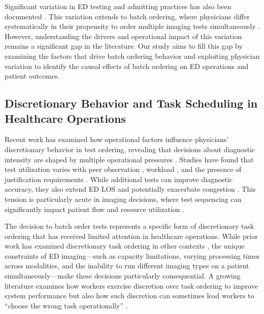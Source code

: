 \documentclass[,,blindrev]{informs}
\begin{document}
Significant variation in ED testing and admitting practices has also
been documented \citep[\citet{Coussens2024},
\citet{Smulowitz2021}]{hodgson2018are}. This variation extends to batch
ordering, where physicians differ systematically in their propensity to
order multiple imaging tests simultaneously
\citep{jameson2024variation}. However, understanding the drivers and
operational impact of this variation remains a significant gap in the
literature. Our study aims to fill this gap by examining the factors
that drive batch ordering behavior and exploiting physician variation to
identify the causal effects of batch ordering on ED operations and
patient outcomes.

\subsection{Discretionary Behavior and Task Scheduling in Healthcare
Operations}\label{discretionary-behavior-and-task-scheduling-in-healthcare-operations}

Recent work has examined how operational factors influence physicians'
discretionary behavior in test ordering, revealing that decisions about
diagnostic intensity are shaped by multiple operational pressures
\citep{soltani2022does}. Studies have found that test utilization varies
with peer observation \citep{song2017closing}, workload \citep{Deo2019},
and the presence of justification requirements \citep{jaeker2020value}.
While additional tests can improve diagnostic accuracy, they also extend
ED LOS and potentially exacerbate congestion \citep{chan2018efficiency}.
This tension is particularly acute in imaging decisions, where test
sequencing can significantly impact patient flow and resource
utilization \citep{Cournane2016}.

The decision to batch order tests represents a specific form of
discretionary task ordering that has received limited attention in
healthcare operations. While prior work has examined discretionary task
ordering in other contexts \citep[\citet{Ibanez2020}]{Ibanez2018}, the
unique constraints of ED imaging---such as capacity limitations, varying
processing times across modalities, and the inability to run different
imaging types on a patient simultaneously---make these decisions
particularly consequential. A growing literature examines how workers
exercise discretion over task ordering to improve system performance
\citep[\citet{Campbell2011}]{vanDonselaar2010ordering} but also how such
discretion can sometimes lead workers to ``choose the wrong task
operationally'' \citep{boudreau2003interface}.
\end{document}
